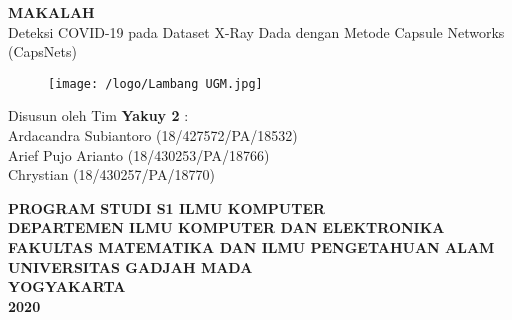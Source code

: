 \documentclass{article}
\begin{document}
  \begin{titlepage}
    \begin{center}
      
      \null
      {
      \huge \bfseries MAKALAH}\\
      [1cm]
      {\LARGE Deteksi COVID-19 pada Dataset X-Ray Dada dengan Metode Capsule Networks (CapsNets)}\\
          
      \vspace{2cm}

      \begin{figure}[H]
        \centering
        \texttt{[image: /logo/Lambang UGM.jpg]}
      \end{figure}
          
      \vspace{3cm}
    
      {\Large 
      Disusun oleh Tim \bfseries Yakuy 2} {\Large :\\
      \vspace{0.5cm}
      Ardacandra Subiantoro (18/427572/PA/18532)\\
      Arief Pujo Arianto (18/430253/PA/18766)\\
      Chrystian (18/430257/PA/18770)\\
      }


      \vspace{2cm}

      {\normalsize \bfseries
      PROGRAM STUDI S1 ILMU KOMPUTER\\
      DEPARTEMEN ILMU KOMPUTER DAN ELEKTRONIKA\\
      FAKULTAS MATEMATIKA DAN ILMU PENGETAHUAN ALAM\\
      UNIVERSITAS GADJAH MADA\\
      YOGYAKARTA\\
      \vspace{0.2cm}
      2020
      }
            
    \end{center}
  \end{titlepage}


  \newpage
\end{document}
